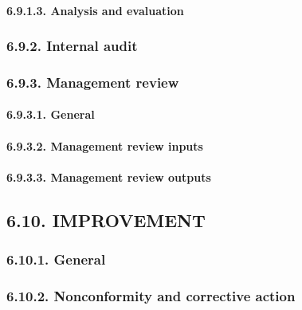 \documentclass[
]{article}
\begin{document}
\hypertarget{analysis-and-evaluation-1}{%
\paragraph{6.9.1.3. Analysis and
evaluation}\label{analysis-and-evaluation-1}}

\hypertarget{internal-audit-1}{%
\subsubsection{6.9.2. Internal audit}\label{internal-audit-1}}

\hypertarget{management-review-1}{%
\subsubsection{6.9.3. Management review}\label{management-review-1}}

\hypertarget{general-16}{%
\paragraph{6.9.3.1. General}\label{general-16}}

\hypertarget{management-review-inputs-1}{%
\paragraph{6.9.3.2. Management review
inputs}\label{management-review-inputs-1}}

\hypertarget{management-review-outputs-1}{%
\paragraph{6.9.3.3. Management review
outputs}\label{management-review-outputs-1}}

\hypertarget{improvement-1}{%
\subsection{6.10. IMPROVEMENT}\label{improvement-1}}

\hypertarget{general-17}{%
\subsubsection{6.10.1. General}\label{general-17}}

\hypertarget{nonconformity-and-corrective-action-1}{%
\subsubsection{6.10.2. Nonconformity and corrective
action}\label{nonconformity-and-corrective-action-1}}
\end{document}
